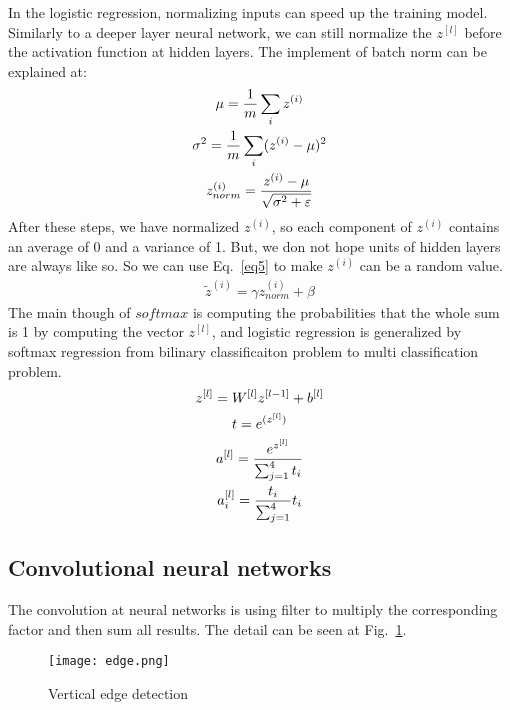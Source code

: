 \documentclass[a4paper]{article}
\begin{document}
In the logistic regression, normalizing inputs can speed up the training model. Similarly to a deeper layer neural network, we can still normalize the $z^{[l]}$ before the activation function at hidden layers. The implement of batch norm can be explained at:\\
\begin{gather}
\mu = \frac{1}{m}\sum_iz^{(i)}\\ \notag
\sigma^2 = \frac{1}{m}\sum_i(z^{(i)} - \mu)^2 \\ \notag
z_{norm}^{(i)} = \frac{z^{(i)} - \mu}{\sqrt{\sigma^2 + \varepsilon}}
\end{gather} 
After these steps, we have normalized $z^{(i)}$, so each component of $z^{(i)}$ contains an average of 0 and a variance of 1. But, we don not hope units of hidden layers are always like so. So we can use Eq.~\ref{eq5} to make $z^{(i)}$ can be a random value. \\
\begin{gather}
\tilde{z}^{(i)} = \gamma z_{norm}^{(i)} + \beta 
\label{eq5}
\end{gather}
The main though of $softmax$ is computing the probabilities that the whole sum is 1 by computing the vector $z^{[l]}$, and logistic regression is generalized by softmax regression from bilinary classificaiton problem to multi classification problem.\\
\begin{gather}
z^{[l]} = W^{[l]}z^{[l-1]} + b^{[l]} \\ \notag
t = e^{(z^{[l]})} \\ \notag
a^{[l]} = \frac{e^{z^{[l]}}}{\sum_{j=1}^4t_i} \\ \notag
a_i^{[l]} = \frac{t_i}{\sum_{j=1}^4}t_i 
\end{gather}

\subsection{Convolutional neural networks}

The convolution at neural networks is using filter to multiply the corresponding factor and then sum all results. The detail can be seen at Fig.~\ref{fig6}.
\begin{figure}[hb]
\begin{center}
\texttt{[image: edge.png]}
\end{center}
\caption{Vertical edge detection}
\label{fig6}
\end{figure}
\end{document}
